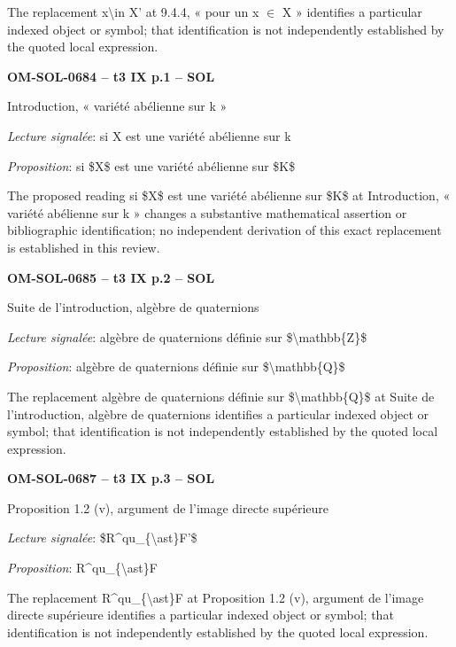 The replacement x\textbackslash{}in X' at 9.4.4, « pour un x \ensuremath{\in} X » identifies a particular indexed object or symbol; that identification is not independently established by the quoted local expression.\par
\par\noindent\textbf{OM-SOL-0684 -- t3 IX p.1 -- SOL}\par
Introduction, « variété abélienne sur k »\par
\emph{Lecture signalée}: si X est une variété abélienne sur k\par
\emph{Proposition}: si \$X\$ est une variété abélienne sur \$K\$\par
The proposed reading si \$X\$ est une variété abélienne sur \$K\$ at Introduction, « variété abélienne sur k » changes a substantive mathematical assertion or bibliographic identification; no independent derivation of this exact replacement is established in this review.\par
\par\noindent\textbf{OM-SOL-0685 -- t3 IX p.2 -- SOL}\par
Suite de l'introduction, algèbre de quaternions\par
\emph{Lecture signalée}: algèbre de quaternions définie sur \$\textbackslash{}mathbb\{Z\}\$\par
\emph{Proposition}: algèbre de quaternions définie sur \$\textbackslash{}mathbb\{Q\}\$\par
The replacement algèbre de quaternions définie sur \$\textbackslash{}mathbb\{Q\}\$ at Suite de l'introduction, algèbre de quaternions identifies a particular indexed object or symbol; that identification is not independently established by the quoted local expression.\par
\par\noindent\textbf{OM-SOL-0687 -- t3 IX p.3 -- SOL}\par
Proposition 1.2 (v), argument de l'image directe supérieure\par
\emph{Lecture signalée}: \$R\textasciicircum{}qu\_\{\textbackslash{}ast\}F'\$\par
\emph{Proposition}: R\textasciicircum{}qu\_\{\textbackslash{}ast\}F\par
The replacement R\textasciicircum{}qu\_\{\textbackslash{}ast\}F at Proposition 1.2 (v), argument de l'image directe supérieure identifies a particular indexed object or symbol; that identification is not independently established by the quoted local expression.\par
